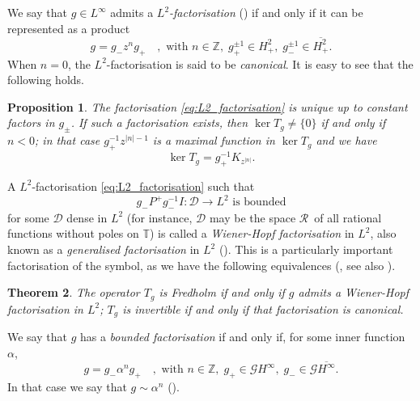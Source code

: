\documentclass[12pt]{elsarticle}
\numberwithin{equation}{section}
\theoremstyle{plain}
\newtheorem{thm}{Theorem}[section]
\newtheorem{prop}[thm]{Proposition}
\newcommand{\Hp}{\ensuremath{H^2_+}}
\newcommand{\Linf}{\ensuremath{L^\infty}}
\newcommand{\Hinf}{\ensuremath{H^\infty}}
\newcommand{\TT}{\ensuremath{\mathbb{T}}}
\newcommand{\ZZ}{\ensuremath{\mathbb{Z}}}
\newcommand{\GG}{\ensuremath{\mathcal{G}}}
\newcommand{\RR}{\ensuremath{\mathcal{R}}}
\newcommand{\ol}[1]{\ensuremath{\overline{#1}}}
\newcommand{\zero}{\ensuremath{\{0\}}}
\begin{document}
We say that $g\in\Linf$ admits a {\em $L^2$-factorisation} (\cite[Chapter 2]{LitSpit87}) if and only if it can be represented as a product
\begin{equation}
\label{eq:L2_factorisation}
g=g_- z^n g_+ \quad , \text{ with } n\in\ZZ,\; g_+^{\pm 1} \in \Hp, \; g_-^{\pm 1} \in \ol\Hp.
\end{equation}
When $n=0$, the $L^2$-factorisation is said to be {\em canonical}.
It is easy to see that the following holds.


\begin{prop}
\label{prop:mult.from.L2-fact}
The factorisation \eqref{eq:L2_factorisation} is unique up to constant factors in $g_\pm$.
If such a factorisation exists, then $\ker T_g\neq\zero$ if and only if $n<0$;
in that case $g_+^{-1} z^{|n|-1}$ is a maximal function in $\ker T_g$ and we have
\begin{equation*}
\ker T_g = g_+^{-1} K_{z^{|n|}}.
\end{equation*}
\end{prop}


A $L^2$-factorisation \eqref{eq:L2_factorisation} such that
\begin{equation}
\label{eq: WH extra condition}
g_-P^+g_-^{-1}I : \mathcal{D}\to L^2 \text{ is bounded}
\end{equation}
for some $\mathcal D$ dense in $L^2$ (for instance, $\mathcal D$ may be the space \RR\ of all rational functions without poles on \TT) is called a {\em Wiener-Hopf factorisation} in $L^2$, also known as a {\em generalised factorisation} in $L^2$ (\cite[Chapter 4, \S 3]{MiPro86}).
This is a particularly important factorisation of the symbol, as we have the following equivalences (\cite{MiPro86}, see also \cite{Ca17}).

\begin{thm}
\label{thm:WH_fact_and_Fredholmness}
The operator $T_g$ is Fredholm if and only if $g$ admits a Wiener-Hopf factorisation in $L^2$;
$T_g$ is invertible if and only if that factorisation is canonical.
\end{thm}


We say that $g$ has a {\em bounded factorisation} if and only if, for some inner function $\alpha$,
\begin{equation}
\label{eq:bounded_factorisation}
g = g_- \alpha^n g_+ \quad , \text{ with } n\in\ZZ,\; g_+\in\GG\Hinf,\; g_-\in\GG\ol\Hinf.
\end{equation}
In that case we say that $g\sim\alpha^n$ (\cite[Definition 2.23]{CP18_multipliers}).
\end{document}
